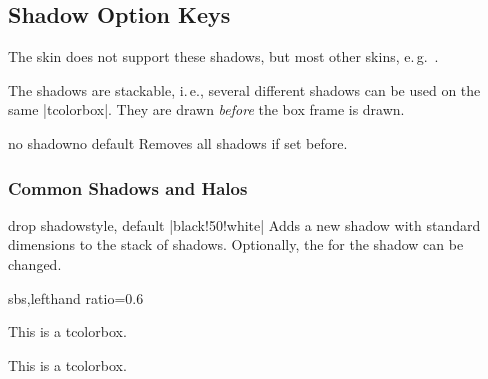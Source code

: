 \begin{dispExample}
\begin{tcolorbox}[enhanced,colback=yellow!10!white,boxrule=0pt,frame hidden,
  borderline north={1mm}{-2mm}{red},
  borderline south={1mm}{-2mm}{blue},
  borderline west={1mm}{-2mm}{green},
  borderline east={1mm}{-2mm}{yellow}]
\lipsum[1]
\end{tcolorbox}
\end{dispExample}

\clearpage
\subsection{Shadow Option Keys}\label{subsec:shadows}
The skin  does not support these shadows,
but most other skins, e.\,g.\ .

The shadows are stackable, i.\,e., several different shadows can be
used on the same |tcolorbox|. They are drawn \emph{before} the box frame is drawn.

\begin{docTcbKey}{no shadow}{}{no default}
  Removes all shadows if set before.
\end{docTcbKey}

\subsubsection{Common Shadows and Halos}

\begin{docTcbKey}{drop shadow}{}{style, default |black!50!white|}
  Adds a new shadow with standard dimensions to the stack of shadows.
  Optionally, the  for the shadow can be changed.
\begin{dispExample*}{sbs,lefthand ratio=0.6}

\begin{tcolorbox}
This is a tcolorbox.
\end{tcolorbox}\par\bigskip
\begin{tcolorbox}[title=Another shadow,
  drop shadow=blue]
This is a tcolorbox.
\end{tcolorbox}
\end{dispExample*}
\end{docTcbKey}


